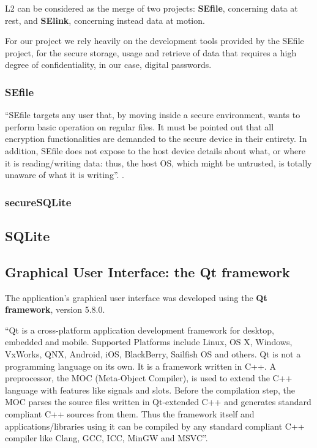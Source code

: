 L2 can be considered as the merge of two projects: \textbf{SEfile}, concerning data at rest, and \textbf{SElink}, concerning instead data at motion.

For our project we rely heavily on the development tools provided by the SEfile project, for the secure storage, usage and retrieve of data that requires a high degree of confidentiality, in our case, digital passwords.

\subsubsection{SEfile}

``SEfile targets any user that, by moving inside a secure environment, wants to perform basic operation on regular files. It must be pointed out that all encryption functionalities are demanded to the secure device in their entirety. In addition, SEfile does not expose to the host device details about what, or where it is reading/writing data: thus, the host OS, which might be untrusted, is totally unaware of what it is writing''. \cite{L2UserMan}.

\subsubsection{secureSQLite}

\subsection{SQLite}

\subsection{Graphical User Interface: the Qt framework}
The application's graphical user interface was developed using the \textbf{Qt framework}, version 5.8.0. 

``Qt is a cross-platform application development framework for desktop, embedded and mobile. Supported Platforms include Linux, OS X, Windows, VxWorks, QNX, Android, iOS, BlackBerry, Sailfish OS and others. Qt is not a programming language on its own. It is a framework written in C++. A preprocessor, the MOC (Meta-Object Compiler), is used to extend the C++ language with features like signals and slots. Before the compilation step, the MOC parses the source files written in Qt-extended C++ and generates standard compliant C++ sources from them. Thus the framework itself and applications/libraries using it can be compiled by any standard compliant C++ compiler like Clang, GCC, ICC, MinGW and MSVC''.\cite{Qt}  


